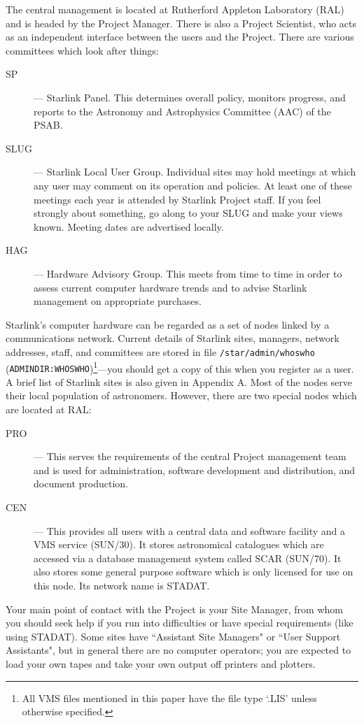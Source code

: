 The central management is located at Rutherford Appleton Laboratory (RAL) and
is headed by the Project Manager.
There is also a Project Scientist, who acts as an independent interface
between the users and the Project.
There are various committees which look after things:
\begin{description}
\item [SP] --- Starlink Panel.
This determines overall policy, monitors progress, and reports to the
Astronomy and Astrophysics Committee (AAC) of the PSAB.
\item [SLUG] --- Starlink Local User Group.
Individual sites may hold meetings at which any user may comment on its
operation and policies.
At least one of these meetings each year is attended by Starlink Project staff.
If you feel strongly about something, go along to your SLUG and make your
views known.
Meeting dates are advertised locally.
\item [HAG] --- Hardware Advisory Group.
This meets from time to time in order to assess current computer hardware trends
and to advise Starlink management on appropriate purchases.
\end{description}
Starlink's computer hardware can be regarded as a set of nodes linked by a
communications network.
Current details of Starlink sites, managers, network addresses, staff, and
committees are stored in file {\tt /star/\-admin/\-whoswho} 
({\tt ADMINDIR:\-WHOSWHO})\footnote{All VMS files mentioned in this paper have
the file type `.LIS' unless otherwise specified.}---you should get a copy of
this when you register as a user.
A brief list of Starlink sites is also given in Appendix A.
Most of the nodes serve their local population of astronomers.
However, there are two special nodes which are located at RAL:
\begin{description}
\item [PRO] --- This serves the requirements of the central Project management
team and is used for administration, software development and distribution, and
document production.
\item [CEN] --- This provides all users with a central data and software
facility and a VMS service (SUN/30).
It stores astronomical catalogues which are accessed via a database management
system called SCAR (SUN/70).
It also stores some general purpose software which is only licensed for use
on this node.
Its network name is STADAT.
\end{description}
Your main point of contact with the Project is your Site Manager, from whom you
should seek help if you run into difficulties or have special
requirements (like using STADAT).
Some sites have ``Assistant Site Managers" or ``User Support Assistants", but in
general there are no computer operators; you are expected to load your own
tapes and take your own output off printers and plotters.

